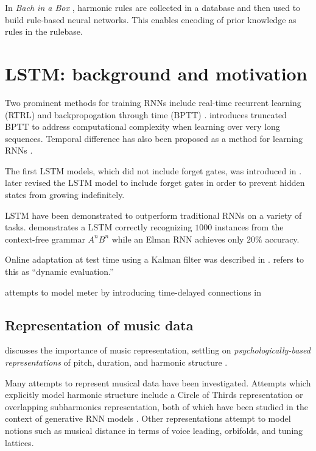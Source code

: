 In \emph{Bach in a Box} \cite{spangler1998bach},
harmonic rules are collected in a database and then used to build rule-based
neural networks. This enables encoding of prior knowledge as rules in the
rulebase.



\section{LSTM: background and motivation}

Two prominent methods for training RNNs include real-time recurrent learning (RTRL)
\cite{robinson1987utility} and backpropogation through time (BPTT) \cite{williams1995gradient}.
\cite{williams1990efficient} introduces truncated BPTT to address computational complexity
when learning over very long sequences. Temporal difference \cite{sutton1998reinforcement} has
also been proposed as a method for learning RNNs \cite{franklin2004predicting}.

The first LSTM models, which did not include forget gates, was introduced in
\cite{hochreiter1997long}. \cite{gers2000learning} later revised the LSTM model
to include forget gates in order to prevent hidden states from growing
indefinitely.

LSTM have been demonstrated to outperform traditional RNNs on a variety of
tasks. \cite{gers2001lstm} demonstrates a LSTM correctly recognizing $1000$
instances from the context-free grammar $A^n B^n$ while an Elman RNN achieves
only $20\%$ accuracy.

Online adaptation at test time using a Kalman filter was described in \cite{gers2002dekf}.
\cite{Mikolov2010} \cite{Mikolov2012} refers to this as ``dynamic evaluation.''

\cite{eck2008learning} attempts to model meter by introducing time-delayed
connections in \cite{Eck2002}

\subsection{Representation of music data}

\cite{mozer1994neural} discusses the importance of music representation,
settling on \emph{psychologically-based representations} of pitch, duration,
and harmonic structure \cite{shepard1982geometrical}.

Many attempts to represent musical data have been investigated. Attempts which
explicitly model harmonic structure include a Circle of Thirds representation
\cite{franklin2004recurrent} or overlapping subharmonics
representation\cite{laden1989representation}, both of which have been studied
in the context of generative RNN models \cite{franklin2004recurrent}
\cite{mozer1994neural}. Other representations attempt to model notions such as
musical distance in terms of voice leading, orbifolds, and tuning
lattices\cite{Tymoczko2009}.

